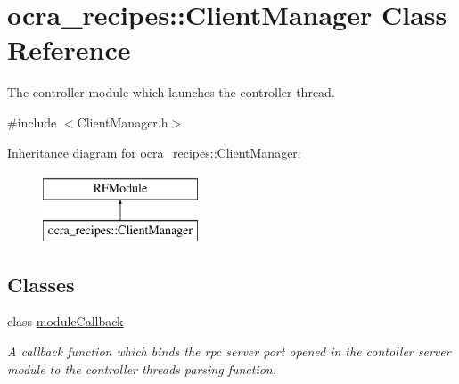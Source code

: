 \hypertarget{classocra__recipes_1_1ClientManager}{}\section{ocra\+\_\+recipes\+:\+:Client\+Manager Class Reference}
\label{classocra__recipes_1_1ClientManager}


The controller module which launches the controller thread.  




{\ttfamily \#include $<$Client\+Manager.\+h$>$}

Inheritance diagram for ocra\+\_\+recipes\+:\+:Client\+Manager\+:\begin{figure}[H]
\begin{center}
\leavevmode
\includegraphics[height=2.000000cm]{dd/d05/classocra__recipes_1_1ClientManager}
\end{center}
\end{figure}
\subsection*{Classes}
\begin{DoxyCompactItemize}
\item 
class \hyperlink{classocra__recipes_1_1ClientManager_1_1moduleCallback}{module\+Callback}
\begin{DoxyCompactList}\small\item\em A callback function which binds the rpc server port opened in the contoller server module to the controller thread\textquotesingle{}s parsing function. \end{DoxyCompactList}\end{DoxyCompactItemize}
